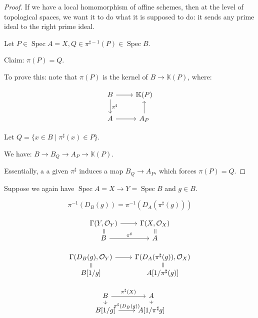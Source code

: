 \documentclass{article}
\theoremstyle{definition}
\begin{document}
    \begin{proof}
        If we have a local homomorphism of affine schemes, then at the level of topological spaces, we want it to do what it is supposed to do: it sends any prime ideal to the right prime ideal.

        Let \(P \in \operatorname{Spec} A = X, Q \in \pi^{\sharp - 1} (P) \in \operatorname{Spec} B\).

        Claim: \(\pi(P) = Q\).

        To prove this: note that \(\pi(P)\) is the kernel of \(B \to \mathbb{K} (P)\), where:

        \[
            \begin{tikzcd}
                B \ar[d,"\pi^\sharp"] \ar[r] & \mathbb{K} (P) \\ A \ar[r] & A_P \ar[u]
            \end{tikzcd}
        \]

        Let \(Q = \{ x\in B \mid \pi^\sharp (x) \in P\}\).
        
        We have: \(B \to B_Q \to A_P \to \mathbb{K} (P)\).

        Essentially, a a given \(\pi^\sharp\) induces a map \(B_Q \to A_P\), which forces \(\pi(P) = Q\).
    \end{proof}

    Suppose we again have \(\operatorname{Spec} A = X \to Y = \operatorname{Spec} B\) and \(g\in B\).

    \[
        \pi ^{-1} (D_B(g)) = \pi ^{-1} (D_A(\pi^{\sharp}(g)))
    \]

    \[
        \begin{tikzcd}[row sep = tiny]
            \Gamma(Y, \mathcal{O}_Y) \ar[d,"=",phantom,sloped] \ar[r] & \Gamma(X, \mathcal{O}_X) \ar[d,"=", phantom, sloped] \\ B \ar[r,"\pi^\sharp"] & A
        \end{tikzcd}
    \]

    \[
        \begin{tikzcd}[row sep = tiny]
            \Gamma(D_B(g), \mathcal{O}_Y) \ar[d,"=",phantom,sloped] \ar[r] & \Gamma(D_A(\pi^\sharp(g)), \mathcal{O}_X) \ar[d,"=",phantom,sloped] \\ B[1 / g] & A[1 / \pi^\sharp (g)]
        \end{tikzcd}
    \]

    \[
        \begin{tikzcd}[row sep = tiny]
            B \ar[r, "\pi^\sharp(X)"] \ar[d] & A \ar[d] \\ B[1 / g] \ar[r,"\pi^\sharp(D_B(g))"] & A[1 / \pi^\sharp g]
        \end{tikzcd}
    \]
\end{document}
